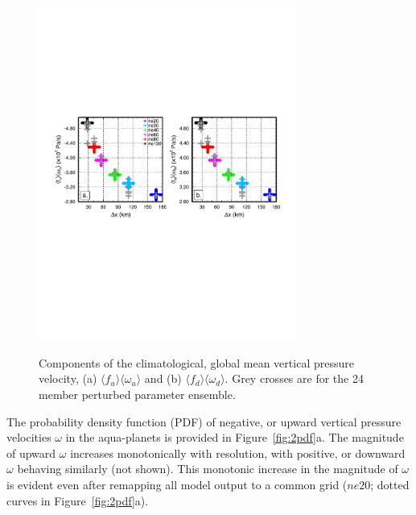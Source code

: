 \documentclass[alpha-refs]{wiley-article}
\begin{document}
\begin{figure}
\begin{center}
\noindent\includegraphics[width=20pc,angle=0]{figs/temp_diags_2panel.pdf}\\
\end{center}
\caption{Components of the climatological, global mean vertical pressure velocity, (a) $\langle f_{u} \rangle \langle \omega_{u} \rangle$ and (b) $\langle f_{d} \rangle \langle \omega_{d} \rangle$. Grey crosses are for the 24 member perturbed parameter ensemble.}
\label{fig:2panel}
\end{figure}

The probability density function (PDF) of negative, or upward vertical pressure velocities $\omega$ in the aqua-planets is provided in Figure~\ref{fig:2pdf}a. The magnitude of upward $\omega$ increases monotonically with resolution, with positive, or downward $\omega$ behaving similarly (not shown). This monotonic increase in the magnitude of $\omega$ is evident even after remapping all model output to a common grid ($ne20$; dotted curves in Figure~\ref{fig:2pdf}a).
\end{document}

